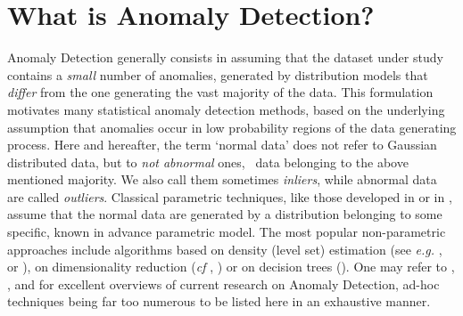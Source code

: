\section{What is Anomaly Detection?}
Anomaly Detection %
generally consists in assuming that the dataset under study contains a \textit{small} number of anomalies, generated by distribution models that  \textit{differ} from the one generating the vast majority of the data.
This formulation motivates many statistical anomaly detection methods, based on the underlying assumption that anomalies occur in low probability regions of the data generating process. Here and hereafter, the term `normal data' does not refer to Gaussian distributed data, but to \emph{not abnormal} ones, \ie~data belonging to the above mentioned majority. We also call them sometimes \emph{inliers}, while abnormal data are called \emph{outliers}. 
Classical parametric techniques, like those developed in \cite{Barnett94} or in \cite{Eskin2000}, assume that the normal data are generated by a distribution belonging to some  specific, known in advance parametric model.  
The most popular non-parametric approaches include algorithms based on density (level set) estimation (see \textit{e.g.} \cite{Scholkopf2001},  \cite{Scott2006} or \cite{Breunig2000LOF}), on dimensionality reduction (\textit{cf} \cite{Shyu2003}, \cite{Aggarwal2001}) or on decision trees (\cite{Liu2008}).
One may refer to \cite{Hodge2004survey}, \cite{Chandola2009survey}, \cite{Patcha2007survey} and \cite{Markou2003survey} for excellent overviews of current research on Anomaly Detection, ad-hoc techniques being far too numerous to be listed here in an exhaustive manner.


